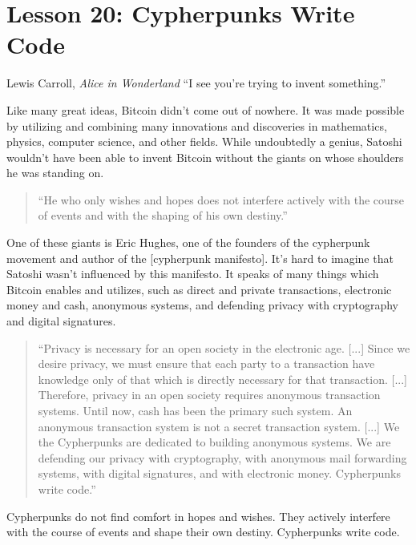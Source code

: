 \chapter{Lesson 20: Cypherpunks Write Code}
\label{les:20}

\begin{chapquote}{Lewis Carroll, \textit{Alice in Wonderland}}
``I see you're trying to invent something.''
\end{chapquote}

Like many great ideas, Bitcoin didn't come out of nowhere. It was made
possible by utilizing and combining many innovations and discoveries in
mathematics, physics, computer science, and other fields. While
undoubtedly a genius, Satoshi wouldn't have been able to invent Bitcoin
without the giants on whose shoulders he was standing on.

\begin{quotation}
``He who only wishes and hopes does not interfere actively with the
course of events and with the shaping of his own destiny.''
\end{quotation}

One of these giants is Eric Hughes, one of the founders of the
cypherpunk movement and author of the [cypherpunk manifesto]. It's hard
to imagine that Satoshi wasn't influenced by this manifesto. It speaks
of many things which Bitcoin enables and utilizes, such as direct and
private transactions, electronic money and cash, anonymous systems, and
defending privacy with cryptography and digital signatures.

\begin{quotation}
``Privacy is necessary for an open society in the electronic age.
[...] Since we desire privacy, we must ensure that each party to a
transaction have knowledge only of that which is directly necessary
for that transaction. [...]
Therefore, privacy in an open society requires anonymous transaction
systems. Until now, cash has been the primary such system. An
anonymous transaction system is not a secret transaction system.
[...]
We the Cypherpunks are dedicated to building anonymous systems. We are
defending our privacy with cryptography, with anonymous mail
forwarding systems, with digital signatures, and with electronic
money.
Cypherpunks write code.''
\end{quotation}

Cypherpunks do not find comfort in hopes and wishes. They actively
interfere with the course of events and shape their own destiny.
Cypherpunks write code.

